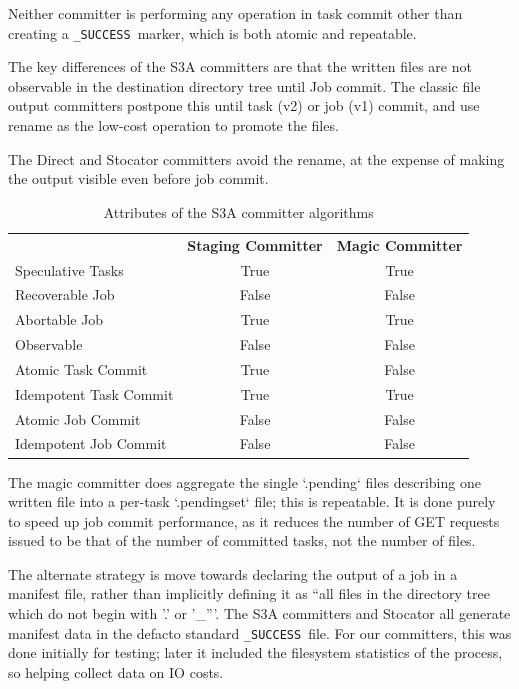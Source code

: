 \documentclass[conference]{IEEEtran}
\newcommand{\SUCCESS}{\texttt{\_SUCCESS}\ }
\begin{document}
Neither committer is performing any operation in task commit other than creating
a \SUCCESS marker, which is both atomic and repeatable.


The key differences of the S3A committers are that the written files are
not observable in the destination directory tree until Job commit.
The classic file output committers postpone this until task (v2) or job (v1)
commit, and use rename as the low-cost operation to promote the files.


The Direct and Stocator committers avoid the rename, at the expense of making
the output visible even before job commit.

\begin{table}
  \label{tab:s3a-committer-attributes}
  \begin{tabular}{ l c c }
    \hline
    & \textbf{Staging Committer} & \textbf{Magic Committer} \\
    Speculative Tasks & True & True \\
    Recoverable Job & False & False \\
    Abortable Job & True & True \\
    Observable & False & False \\
    Atomic Task Commit & True & False \\
    Idempotent Task Commit & True & True \\
    Atomic Job Commit & False & False \\
    Idempotent Job Commit & False & False \\
    \hline
  \end{tabular}
  \caption{Attributes of the S3A committer algorithms}
\end{table}


The magic committer does aggregate the single `.pending` files describing
one written file into a per-task `.pendingset` file;
this is repeatable.
It is done purely to speed up job commit performance, as it reduces the
number of GET requests issued to be that of the number of committed tasks,
not the number of files.


The alternate strategy is move towards declaring the output of a job in
a manifest file, rather than implicitly defining it as ``all files in the directory
tree which do not begin with '.' or '\_'''.
The S3A committers and Stocator all generate manifest data in the defacto
standard \SUCCESS file.
For our committers, this was done initially for testing;
later it included the filesystem statistics of the process, so helping
collect data on IO costs.
\end{document}
